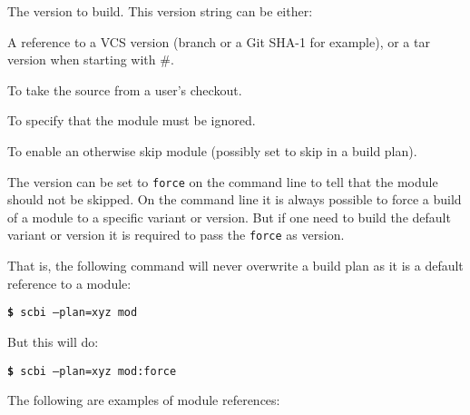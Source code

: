 \documentclass[a4paper,12pt,twoside]{article}
\newcommand{\code}[1]{\texttt{#1}}
\newcommand{\cmd}[1]{\tabto{1cm}\hspace{0.5cm}\texttt{\textbf{\$} #1}}
\begin{document}
\begin{description}[style=nextline]
	\item[version] The version to build. This version string can be either:

	\begin{description}[font=\texttt]
		\item[<ID>] A reference to a VCS version (branch or a Git SHA-1 for example), or a tar version when starting with \#.
		\item[dev] To take the source from a user's checkout.
		\item[skip] To specify that the module must be ignored.
		\item[force] To enable an otherwise skip module (possibly set to skip in a build plan).
	\end{description}

	The version can be set to \code{force} on the command line to tell that the module should not be skipped. On the command line it is always possible to force a build of a module to a specific variant or version. But if one need to build the default variant or version it is required to pass the \code{force} as version.

	That is, the following command will never overwrite a build plan as it is a default reference to a module:

	\cmd{scbi --plan=xyz mod}

	But this will do:

	\cmd{scbi --plan=xyz mod:force}
\end{description}

The following are examples of module references:
\end{document}
